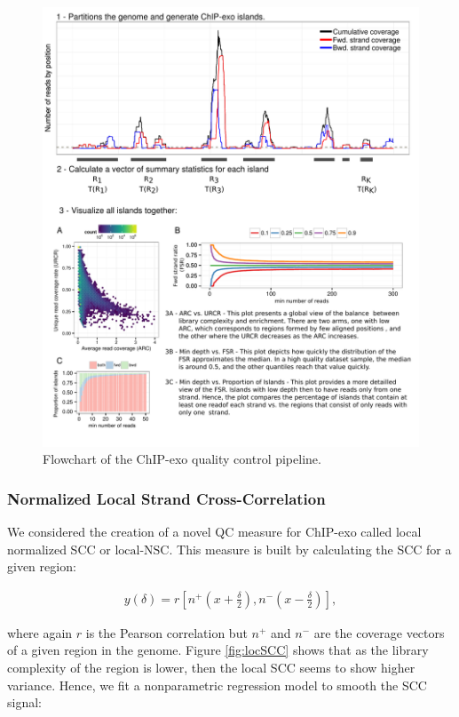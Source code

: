 \documentclass[11pt]{article}\usepackage[]{graphicx}\usepackage[]{color}
\begin{document}
\begin{figure}[h!]
  \centering
  \includegraphics[width = .7\textwidth]{../figs/for_paper/coverage_diagram2.pdf}
  \caption{Flowchart of the ChIP-exo quality control pipeline.}
  \label{fig:qcdiagram}
\end{figure}

\subsubsection{Normalized Local Strand Cross-Correlation}
\label{sec:locNSC}

We considered the creation of a novel QC measure for ChIP-exo called
local normalized SCC or $\mbox{local-NSC}$. This measure is built by
calculating the SCC for a given region:

\begin{align}
  y(\delta) = r\left[ n^+ \left(x + \frac{\delta}{2}
    \right), n^- \left( x- \frac{\delta}{2} \right)\right],
\nonumber
\end{align}

where again $r$ is the Pearson correlation but $n^+$ and $n^-$ are the
coverage vectors of a given region in the genome. Figure
\ref{fig:locSCC} shows that as the library complexity of the region is
lower, then the local SCC seems to show higher variance. Hence, we
fit a nonparametric regression model to smooth the SCC signal:
\end{document}
